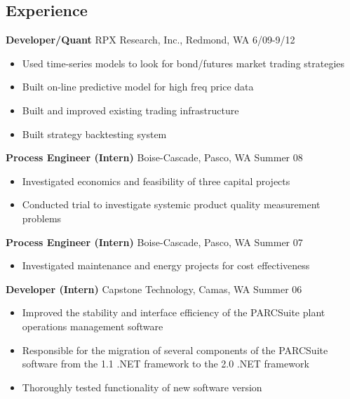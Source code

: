 \documentclass[margin]{res}
\begin{document}
 
 
\begin{resume} 
 

\section{Experience}
  {\bf Developer/Quant} RPX Research, Inc., Redmond, WA \hfill 6/09-9/12 
    \vspace{6pt}
   \begin{itemize} \itemsep -2pt  %
     \item Used time-series models to look for bond/futures market trading strategies 
     \item Built on-line predictive model for high freq price data 
     \item Built and improved existing trading infrastructure
     \item Built strategy backtesting system
   \end{itemize}

  {\bf Process Engineer (Intern)} Boise-Cascade, Pasco, WA \hfill  Summer 08
    \vspace{6pt}
  \begin{itemize} \itemsep -2pt %
    \item Investigated economics and feasibility of three capital projects 
    \item Conducted trial to investigate systemic product quality measurement problems 
  \end{itemize}

  {\bf Process Engineer (Intern)} Boise-Cascade, Pasco, WA \hfill  Summer 07
    \vspace{6pt}
  \begin{itemize} \itemsep -2pt
    \item Investigated maintenance and energy projects for cost effectiveness 
   \end{itemize}

  {\bf Developer (Intern)} Capstone Technology, Camas, WA \hfill  Summer 06
    \vspace{6pt}
  \begin{itemize} \itemsep -2pt
    \item Improved the stability and interface efficiency of the PARCSuite plant operations management software 
    \item Responsible for the migration of several components of the PARCSuite software from the 1.1 .NET framework to the 2.0 .NET framework 
    \item Thoroughly tested functionality of new software version 
   \end{itemize}


\end{resume}
\end{document}
